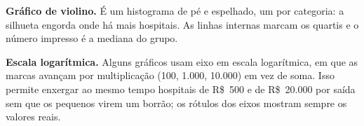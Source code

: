 \textbf{Gráfico de violino.} É um histograma de pé e espelhado, um por
categoria: a silhueta engorda onde há mais hospitais. As linhas
internas marcam os quartis e o número impresso é a mediana do grupo.

\textbf{Escala logarítmica.} Alguns gráficos usam eixo em escala
logarítmica, em que as marcas avançam por multiplicação (100, 1.000,
10.000) em vez de soma. Isso permite enxergar ao mesmo tempo hospitais
de R\$~500 e de R\$~20.000 por saída sem que os pequenos virem um
borrão; os rótulos dos eixos mostram sempre os valores reais.

